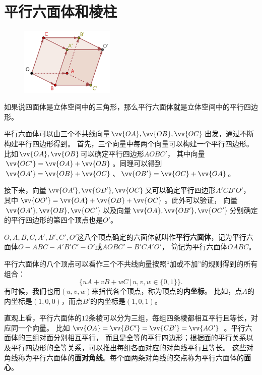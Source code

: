 \documentclass[12pt,UTF8]{ctexbook}
\begin{document}
\section{平行六面体和棱柱}

\begin{figure} %
    \vspace{-40pt}
    \flushright
    \includegraphics[width=0.4\textwidth]{平行六面体1.png}
\end{figure}

如果说四面体是立体空间中的三角形，那么平行六面体就是立体空间中的平行四边形。

平行六面体可以由三个不共线向量$\vv{OA},\vv{OB},\vv{OC}$出发，通过不断构建平行四边形得到。
首先，三个向量中每两个向量可以构建一个平行四边形。比如$\vv{OA},\vv{OB}$可以确定平行四边形$AOBC'$，
其中向量$\vv{OC'}=\vv{OA}+\vv{OB}$。同理可以得到$\vv{OA'}=\vv{OB}+\vv{OC}$、$\vv{OB'}=\vv{OC}+\vv{OA}$。

接下来，向量$\vv{OA'},\vv{OB'},\vv{OC}$又可以确定平行四边形$A'CB'O'$，
其中$\vv{OO'}=\vv{OA}+\vv{OB}+\vv{OC}$。此外可以验证，
向量$\vv{OA'},\vv{OB},\vv{OC'}$以及向量$\vv{OA},\vv{OB'},\vv{OC'}$分别确定的平行四边形的第四个顶点也是$O'$。

$O,A,B,C,A',B',C',O'$这八个顶点确定的六面体就叫作\textbf{平行六面体}，记为平行六面体$O-ABC-A'B'C'-O'$或$AOBC'-B'CA'O'$，
简记为平行六面体$OABC$。

平行六面体的八个顶点可以看作三个不共线向量按照“加或不加”的规则得到的所有组合：
$$ \big\{uA+vB+wC \, | \, u,v,w\in\{0,1\}\big\}.$$
有时候，我们也用$(u,v,w)$来指代各个顶点，称为顶点的\textbf{内坐标}。
比如，点$A$的内坐标是$(1,0,0)$，而点$B'$的内坐标是$(1,0,1)$。

直观上看，平行六面体的$12$条棱可以分为三组，每组四条棱都相互平行且等长，对应同一个向量。
比如$\vv{OA} = \vv{BC'} = \vv{CB'} = \vv{AO'}$ 。平行六面体的三组对面分别相互平行，
而且是全等的平行四边形；根据面的平行关系以及平行四边形的全等关系，可以推出每组各面对应的对角线平行且等长。
这些对角线称为平行六面体的\textbf{面对角线}。每个面两条对角线的交点称为平行六面体的\textbf{面心}。
\end{document}
